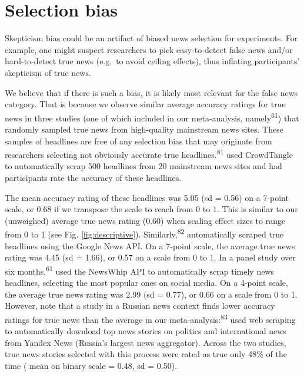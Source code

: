 \documentclass[
  man]{apa6}
\begin{document}
\clearpage

\section{Selection bias}\label{selection-bias}

Skepticism bias could be an artifact of biased news selection for experiments. For example, one might suspect researchers to pick easy-to-detect false news and/or hard-to-detect true news (e.g.~to avoid ceiling effects), thus inflating participants' skepticism of true news.

We believe that if there is such a bias, it is likely most relevant for the false news category. That is because we observe similar average accuracy ratings for true news in three studies (one of which included in our meta-analysis, namely\textsuperscript{61}) that randomly sampled true news from high-quality mainstream news sites. These samples of headlines are free of any selection bias that may originate from researchers selecting not obviously accurate true headlines.\textsuperscript{81} used CrowdTangle to automatically scrap 500 headlines from 20 mainstream news sites and had participants rate the accuracy of these headlines.

The mean accuracy rating of these headlines was 5.05 (sd = 0.56) on a 7-point scale, or 0.68 if we transpose the scale to reach from 0 to 1. This is similar to our (unweighed) average true news rating (0.60) when scaling effect sizes to range from 0 to 1 (see Fig. \ref{fig:descriptive}). Similarly,\textsuperscript{82} automatically scraped true headlines using the Google News API. On a 7-point scale, the average true news rating was 4.45 (sd = 1.66), or 0.57 on a scale from 0 to 1. In a panel study over six months,\textsuperscript{61} used the NewsWhip API to automatically scrap timely news headlines, selecting the most popular ones on social media. On a 4-point scale, the average true news rating was 2.99 (sd = 0.77), or 0.66 on a scale from 0 to 1. However, note that a study in a Russian news context finds lower accuracy ratings for true news than the average in our meta-analysis:\textsuperscript{83} used web scraping to automatically download top news stories on politics and international news from Yandex News (Russia's largest news aggregator). Across the two studies, true news stories selected with this process were rated as true only 48\% of the time ( mean on binary scale = 0.48, sd = 0.50).
\end{document}
